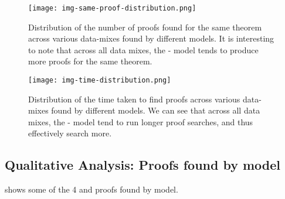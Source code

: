\begin{figure*}[h]
\footnotesize
\texttt{[image: img-same-proof-distribution.png]}
\caption{Distribution of the number of proofs found for the same theorem across various data-mixes found by different \name\; models. It is interesting to note that across all data mixes, the \name-\multi\; model tends to produce more proofs for the same theorem.}
\label{fig:proof-tree-stats-same-proof}
\end{figure*}

\begin{figure*}[h]
\footnotesize
\texttt{[image: img-time-distribution.png]}
\caption{Distribution of the time taken to find proofs across various data-mixes found by different \name\; models. We can see that across all data mixes, the \name-\multi\; model tend to run longer proof searches, and thus effectively search more.}
\label{fig:proof-tree-stats-time}
\end{figure*}


\subsection{Qualitative Analysis: Proofs found by \multi\; model}
\label{app:proofs}

 shows some of the \lean{} 4 and \coq{} proofs found by \multi{} model.

